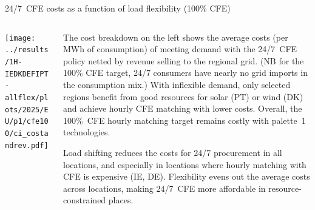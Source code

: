\begin{frame}{24/7~CFE costs as a function of load flexibility (100\% CFE)}

  {\footnotesize
  \vspace{0.2cm}
  
  \begin{columns}[T]
  \begin{column}{9cm}
  \centering
  \texttt{[image: ../results/1H-IEDKDEFIPT-allflex/plots/2025/EU/p1/cfe100/ci\_costandrev.pdf]}
  \end{column}

  \begin{column}{6cm}
  The \alert{cost breakdown} on the left shows the average costs (per MWh of consumption) of meeting demand with the 24/7~CFE policy netted by revenue selling to the regional grid. (NB for the 100\% CFE target, 24/7 consumers have nearly no grid imports in the consumption mix.) With inflexible demand, only selected regions benefit from good resources for solar (PT) or wind (DK) and achieve hourly CFE matching with lower costs. Overall, the 100\%~CFE hourly matching target remains costly with palette~1 technologies.

  \vspace{0.1cm}
  \alert{Load shifting reduces the costs for 24/7 procurement in all locations}, and especially in locations where hourly matching with CFE is expensive (IE, DE). Flexibility evens out the average costs across locations, making 24/7~CFE more affordable in resource-constrained places.

  \end{column}
  \end{columns}
  }
\end{frame}
  


